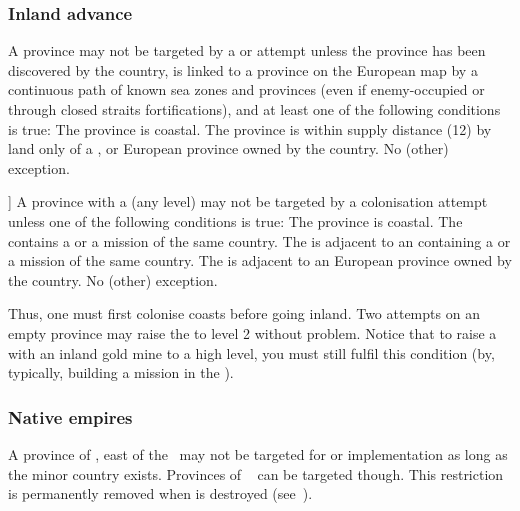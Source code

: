\subsubsection{Inland advance}\label{chExpenses:Inland advance}
\aparag[Settlements] A province may not be targeted by a \COL or \TP attempt
unless the province has been discovered by the country, is linked to a
province on the European map by a continuous path of known sea zones and
provinces (even if enemy-occupied or through closed straits fortifications),
and at least one of the following conditions is true:
\bparag The province is coastal.
\bparag The province is within supply distance (12\MP) by land only of a \COL,
\TP or European province owned by the country.
\bparag No (other) exception.

\aparag[Inland advance [TBD]] A province with a \COL (any level) may not be
targeted by a colonisation attempt unless one of the following conditions is
true:
\bparag The province is coastal.
\bparag The \Area contains a \COL\faceplus or a mission of the same country.
\bparag The \Area is adjacent to an \Area containing a \COL\faceplus or a
mission of the same country.
\bparag The \Area is adjacent to an European province owned by the country.
\bparag No (other) exception.

\begin{designnote}
  Thus, one must first colonise coasts before going inland. Two attempts on an
  empty province may raise the \COL to level 2 without problem. Notice that to
  raise a \COL with an inland gold mine to a high level, you must still fulfil
  this condition (by, typically, building a mission in the \Area).
\end{designnote}


\subsubsection{Native empires}\label{chExpenses:Native empires}
\aparag[Siberia] A province of \continentSiberia, east of the \Area\
\granderegionSiberie may not be targeted for \TP or \COL implementation as
long as the minor country \paysSiberie exists. Provinces of \Area\
 can be targeted though.
\bparag This restriction is permanently removed when \pays{Siberie} is
destroyed (see~\ruleref{chSpecific:Siberia}).

